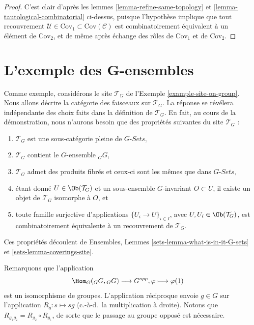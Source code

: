 \begin{proof}
C’est clair d’après les lemmes \ref{lemma-refine-same-topology} et
\ref{lemma-tautological-combinatorial} ci-dessus, puisque l’hypothèse implique
que tout recouvrement
$\mathcal{U} \in \text{Cov}_1 \subset \text{Cov}(\mathcal{C})$ est
combinatoirement équivalent à un élément de $\text{Cov}_2$, et de même après
échange des rôles de $\text{Cov}_1$ et de $\text{Cov}_2$.
\end{proof}












\section{L’exemple des G-ensembles}
\label{section-example-sheaf-G-sets}

\noindent
Comme exemple, considérons le site $\mathcal{T}_G$ de
l’Exemple \ref{example-site-on-group}. Nous allons décrire la
catégorie des faisceaux sur $\mathcal{T}_G$. La réponse se révélera
indépendante des choix faits dans la définition de $\mathcal{T}_G$.
En fait, au cours de la démonstration, nous n’aurons besoin que des
propriétés suivantes du site $\mathcal{T}_G$ :
\begin{enumerate}
\item[(a)] $\mathcal{T}_G$ est une sous-catégorie pleine de $G\textit{-Sets}$,
\item[(b)] $\mathcal{T}_G$ contient le $G$-ensemble ${}_GG$,
\item[(c)] $\mathcal{T}_G$ admet des produits fibrés et ceux-ci sont les mêmes que
dans $G\textit{-Sets}$,
\item[(d)] étant donné $U \in \Ob(\mathcal{T}_G)$ et un sous-ensemble
$G$-invariant $O \subset U$, il existe un objet de $\mathcal{T}_G$ isomorphe
à $O$, et
\item[(e)] toute famille surjective d’applications $\{U_i \to U\}_{i \in I}$, avec
$U, U_i \in \Ob(\mathcal{T}_G)$, est combinatoirement équivalente à un
recouvrement de $\mathcal{T}_G$.
\end{enumerate}
Ces propriétés découlent de Ensembles, Lemmes \ref{sets-lemma-what-is-in-it-G-sets}
et \ref{sets-lemma-coverings-site}.

\medskip\noindent
Remarquons que l’application
$$
\Hom_G({}_GG, {}_GG)
\longrightarrow
G^{opp},
\varphi
\longmapsto
\varphi(1)
$$
est un isomorphisme de groupes. L’application réciproque envoie $g \in G$
sur l’application $R_g : s \mapsto sg$ (c.-à-d.\ la multiplication à droite).
Notons que $R_{g_1g_2} = R_{g_2} \circ R_{g_1}$, de sorte que le passage au groupe
opposé est nécessaire.

